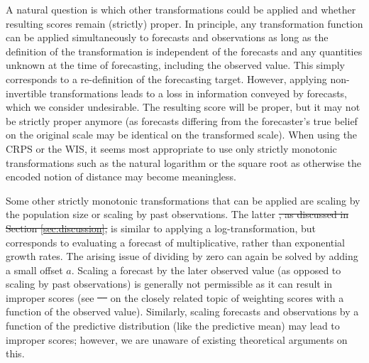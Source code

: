 \documentclass[10pt,letterpaper]{article} %
\providecommand{\DIFaddtex}[1]{{\protect\color{blue}\uwave{#1}}} %
\providecommand{\DIFdeltex}[1]{{\protect\color{red}\sout{#1}}}                      %
\providecommand{\DIFaddbegin}{} %
\providecommand{\DIFaddend}{} %
\providecommand{\DIFdelbegin}{} %
\providecommand{\DIFdelend}{} %
\providecommand{\DIFadd}[1]{\texorpdfstring{\DIFaddtex{#1}}{#1}} %
\providecommand{\DIFdel}[1]{\texorpdfstring{\DIFdeltex{#1}}{}} %
\newcommand{\DIFscaledelfig}{0.5}
\newlength{\DIFdelgraphicswidth} %
\newlength{\DIFdelgraphicsheight} %
\newcommand{\DIFaddincludegraphics}[2][]{{\color{blue}\fbox{\DIFOincludegraphics[#1]{#2}}}} %
\newcommand{\DIFdelincludegraphics}[2][]{%
\sbox{\DIFdelgraphicsbox}{\DIFOincludegraphics[#1]{#2}}%
\settoboxwidth{\DIFdelgraphicswidth}{\DIFdelgraphicsbox} %
\settoboxtotalheight{\DIFdelgraphicsheight}{\DIFdelgraphicsbox} %
\scalebox{\DIFscaledelfig}{%
\parbox[b]{\DIFdelgraphicswidth}{\usebox{\DIFdelgraphicsbox}\\[-\baselineskip] \rule{\DIFdelgraphicswidth}{0em}}\llap{\resizebox{\DIFdelgraphicswidth}{\DIFdelgraphicsheight}{%
\setlength{\unitlength}{\DIFdelgraphicswidth}%
\begin{picture}(1,1)%
\thicklines\linethickness{2pt} %
{\color[rgb]{1,0,0}\put(0,0){\framebox(1,1){}}}%
{\color[rgb]{1,0,0}\put(0,0){\line( 1,1){1}}}%
{\color[rgb]{1,0,0}\put(0,1){\line(1,-1){1}}}%
\end{picture}%
}\hspace*{3pt}}} %
} %
\DeclareRobustCommand{\DIFaddbegin}{\DIFOaddbegin \let\includegraphics\DIFaddincludegraphics} %
\DeclareRobustCommand{\DIFaddend}{\DIFOaddend \let\includegraphics\DIFOincludegraphics} %
\DeclareRobustCommand{\DIFdelbegin}{\DIFOdelbegin \let\includegraphics\DIFdelincludegraphics} %
\DeclareRobustCommand{\DIFdelend}{\DIFOaddend \let\includegraphics\DIFOincludegraphics} %
\begin{document}
A natural question is which other transformations could be applied and whether resulting scores remain (strictly) proper. In principle, any transformation function can be applied simultaneously to forecasts and observations as long as the definition of the transformation is independent of the forecasts and any quantities unknown at the time of forecasting, including the observed value. This simply corresponds to a re-definition of the forecasting target. However, applying non-invertible transformations leads to a loss in information conveyed by forecasts, which we consider undesirable. The resulting score will be proper, but it may not be strictly proper anymore (as forecasts differing from the forecaster's true belief on the original scale may be identical on the transformed scale). When using the CRPS or the WIS, it seems most appropriate to use only strictly monotonic transformations such as the natural logarithm or the square root as otherwise the encoded notion of distance may become meaningless. 

Some other strictly monotonic transformations that can be applied are scaling by the population size or scaling by past observations. The latter \DIFdelbegin \DIFdel{, as discussed in Section \ref{sec:discussion}, }\DIFdelend is similar to applying a log-transformation, but corresponds to evaluating a forecast of multiplicative, rather than exponential growth rates. The arising issue of dividing by zero can again be solved by adding a small offset $a$. Scaling a forecast by the later observed value (as opposed to scaling by past observations) is generally not permissible as it can result in improper scores (see \DIFdelbegin \DIFdel{\mbox{%
\citealt{lerchForecasterDilemmaExtreme2015} }\hskip0pt%
}\DIFdelend \DIFaddbegin \DIFadd{\mbox{%
\cite{lerchForecasterDilemmaExtreme2015} }\hskip0pt%
}\DIFaddend on the closely related topic of weighting scores with a function of the observed value). Similarly, scaling forecasts and observations by a function of the predictive distribution (like the predictive mean) may lead to improper scores; however, we are unaware of existing theoretical arguments on this. 
\end{document}
